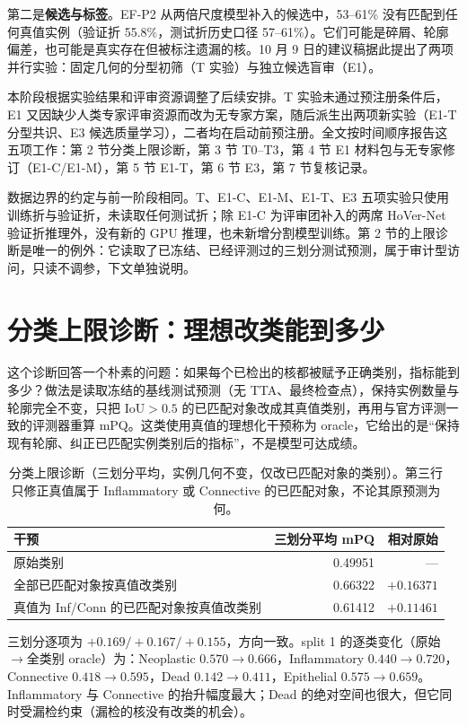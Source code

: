 \documentclass[11pt,a4paper,UTF8,fontset=fandol]{ctexart}
\begin{document}
第二是\textbf{候选与标签}。EF-P2 从两倍尺度模型补入的候选中，53--61\% 没有匹配到任何真值实例（验证折 55.8\%，测试折历史口径 57--61\%）。它们可能是碎屑、轮廓偏差，也可能是真实存在但被标注遗漏的核。10 月 9 日的建议稿\cite{next}据此提出了两项并行实验：固定几何的分型初筛（T 实验）与独立候选盲审（E1）。

本阶段根据实验结果和评审资源调整了后续安排。T 实验未通过预注册条件后，E1 又因缺少人类专家评审资源而改为无专家方案，随后派生出两项新实验（E1-T 分型共识、E3 候选质量学习），二者均在启动前预注册\cite{specs}。全文按时间顺序报告这五项工作：第 2 节分类上限诊断，第 3 节 T0--T3，第 4 节 E1 材料包与无专家修订（E1-C/E1-M），第 5 节 E1-T，第 6 节 E3，第 7 节复核记录。

数据边界的约定与前一阶段相同。T、E1-C、E1-M、E1-T、E3 五项实验只使用训练折与验证折，未读取任何测试折；除 E1-C 为评审团补入的两席 HoVer-Net 验证折推理外，没有新的 GPU 推理，也未新增分割模型训练。第 2 节的上限诊断是唯一的例外：它读取了已冻结、已经评测过的三划分测试预测，属于审计型访问，只读不调参，下文单独说明。

\section{分类上限诊断：理想改类能到多少}

这个诊断回答一个朴素的问题：如果每个已检出的核都被赋予正确类别，指标能到多少？做法是读取冻结的基线测试预测（无 TTA、最终检查点），保持实例数量与轮廓完全不变，只把 IoU$>0.5$ 的已匹配对象改成其真值类别，再用与官方评测一致的评测器重算 mPQ\cite{structure}。这类使用真值的理想化干预称为 oracle，它给出的是“保持现有轮廓、纠正已匹配实例类别后的指标”，不是模型可达成绩。

\begin{table}[H]
\centering\small
\caption{分类上限诊断（三划分平均，实例几何不变，仅改已匹配对象的类别）。第三行只修正真值属于 Inflammatory 或 Connective 的已匹配对象，不论其原预测为何。}
\label{tab:oracle}
\begin{tabular}{lrr}\toprule
干预 & 三划分平均 mPQ & 相对原始\\\midrule
原始类别 & 0.49951 & —\\
全部已匹配对象按真值改类别 & 0.66322 & $+0.16371$\\
真值为 Inf/Conn 的已匹配对象按真值改类别 & 0.61412 & $+0.11461$\\
\bottomrule
\end{tabular}
\end{table}

三划分逐项为 $+0.169/+0.167/+0.155$，方向一致。split 1 的逐类变化（原始$\to$全类别 oracle）为：Neoplastic $0.570\to0.666$，Inflammatory $0.440\to0.720$，Connective $0.418\to0.595$，Dead $0.142\to0.411$，Epithelial $0.575\to0.659$。Inflammatory 与 Connective 的抬升幅度最大；Dead 的绝对空间也很大，但它同时受漏检约束（漏检的核没有改类的机会）。
\end{document}
